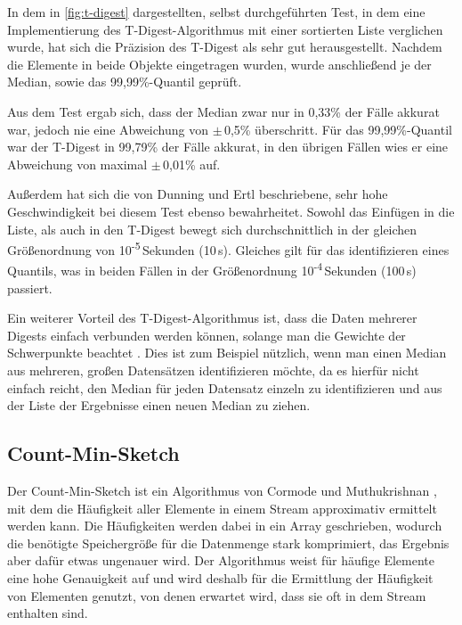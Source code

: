 In dem in \autoref{fig:t-digest} dargestellten, selbst durchgeführten Test, in dem eine Implementierung des T-Digest-Algorithmus mit einer sortierten Liste verglichen wurde, hat sich die Präzision des T-Digest als sehr gut herausgestellt.
Nachdem die Elemente in beide Objekte eingetragen wurden, wurde anschließend je der Median, sowie das 99,99\%-Quantil geprüft.

Aus dem Test ergab sich, dass der Median zwar nur in 0,33\% der Fälle akkurat war, jedoch nie eine Abweichung von $\pm$\,0,5\% überschritt.
Für das 99,99\%-Quantil war der T-Digest in 99,79\% der Fälle akkurat, in den übrigen Fällen wies er eine Abweichung von maximal $\pm$\,0,01\% auf.

Außerdem hat sich die von Dunning und Ertl \cite{dunning2019} beschriebene, sehr hohe Geschwindigkeit bei diesem Test ebenso bewahrheitet.
Sowohl das Einfügen in die Liste, als auch in den T-Digest bewegt sich durchschnittlich in der gleichen Größenordnung von 10\textsuperscript{-5}\,Sekunden (10\,\textmu{}s).
Gleiches gilt für das identifizieren eines Quantils, was in beiden Fällen in der Größenordnung 10\textsuperscript{-4}\,Sekunden (100\,\textmu{}s) passiert.

Ein weiterer Vorteil des T-Digest-Algorithmus ist, dass die Daten mehrerer Digests einfach verbunden werden können, solange man die Gewichte der Schwerpunkte beachtet \cite{dunning2019}.
Dies ist zum Beispiel nützlich, wenn man einen Median aus mehreren, großen Datensätzen identifizieren möchte, da es hierfür nicht einfach reicht, den Median für jeden Datensatz einzeln zu identifizieren und aus der Liste der Ergebnisse einen neuen Median zu ziehen.


\subsection{Count-Min-Sketch}

Der Count-Min-Sketch ist ein Algorithmus von Cormode und Muthukrishnan \cite{cormode2005}, 
mit dem die Häufigkeit aller Elemente in einem Stream approximativ ermittelt werden kann. 
Die Häufigkeiten werden dabei in ein Array geschrieben, 
wodurch die benötigte Speichergröße für die Datenmenge stark komprimiert, 
das Ergebnis aber dafür etwas ungenauer wird. 
Der Algorithmus weist für häufige Elemente eine hohe Genauigkeit auf 
und wird deshalb für die Ermittlung der Häufigkeit von Elementen genutzt, 
von denen erwartet wird, dass sie oft in dem Stream enthalten sind.

